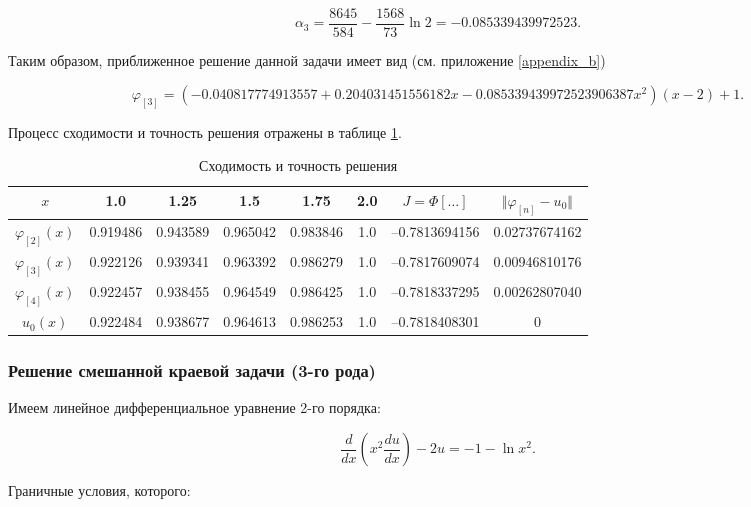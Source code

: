 \documentclass{article}
\begin{document}
\begin{displaymath}
	\alpha_{3} = \frac{8645}{584} - \frac{1568}{73} \ln{2} = -0.085339439972523.
\end{displaymath}

Таким образом, приближенное решение данной задачи имеет вид (см. приложение \ref{appendix_b})

\begin{displaymath}	
	\varphi_{[3]} = (-0.040817774913557+0.204031451556182x -0.085339439972523906387x^2)(x-2) + 1.
\end{displaymath}

\noindent Процесс сходимости и точность решения отражены в таблице \ref{table_process_of_convergence_rank_2}.

\begin{table}[!h]
\centering
\begin{tabular}{|c|c|c|c|c|c|c|c|}
	\hline
	$x$ & 1.0 & 1.25 & 1.5 & 1.75 & 2.0 & $J = \Phi[\ldots]$ & $\Vert \varphi_{[n]} - u_{0} \Vert$ \\
	\hline \hline

	$\varphi_{[2]}(x)$ & 0.919486 & 0.943589 & 0.965042 & 0.983846 & 1.0 & –0.7813694156 & 0.02737674162 \\	\hline
	$\varphi_{[3]}(x)$ & 0.922126 & 0.939341 & 0.963392 & 0.986279 & 1.0 & –0.7817609074 & 0.00946810176 \\	\hline
	$\varphi_{[4]}(x)$ & 
0.922457 & 0.938455 & 0.964549 & 0.986425 & 1.0 & –0.7818337295 & 0.00262807040 \\	\hline
	$u_{0}(x)$ & 0.922484 & 0.938677 & 0.964613 & 0.986253 & 1.0 & –0.7818408301 & 0 \\	\hline

\end{tabular}
\caption{Сходимость и точность решения}
\label{table_process_of_convergence_rank_2}
\end{table}

\subsubsection{Решение смешанной краевой задачи (3-го рода)}

Имеем линейное дифференциальное уравнение 2-го порядка:

\begin{displaymath}
	\frac{d}{dx} \left( x^2 \frac{d u}{dx} \right) - 2u = -1 - \ln{x^2}.
\end{displaymath}

\noindent Граничные условия, которого:
\end{document}

